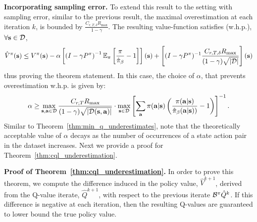 \textbf{Incorporating sampling error.} To extend this result to the setting with sampling error, similar to the previous result, the maximal overestimation at each iteration $k$, is bounded by $\frac{C_{r, T, \delta} R_{\max}}{1 - \gamma}$.
The resulting value-function satisfies (w.h.p.), $\forall \mathbf{s} \in \mathcal{D}$, 
\begin{equation*}
   \hat{V}^\pi(\mathbf{s}) \leq V^\pi(\mathbf{s}) - \alpha \left[\left(I - \gamma P^\pi \right)^{-1} \mathbb{E}_{\pi}\left[\frac{\pi}{\hat{\pi}_\beta} - 1 \right] \right](\mathbf{s}) + \left[ (I - \gamma P^\pi)^{-1} \frac{C_{r, T, \delta} R_{\max}}{(1- \gamma) \sqrt{|\mathcal{D}|}}\right](\mathbf{s})
\end{equation*}
thus proving the theorem statement. In this case, the choice of $\alpha$, that prevents overestimation w.h.p. is given by:
\begin{equation*}
    \alpha \geq \max_{\mathbf{s}, \mathbf{a} \in \mathcal{D}} \frac{C_{r, T} R_{\max}}{(1 - \gamma) \sqrt{|\mathcal{D}(\mathbf{s}, \mathbf{a})|}} \cdot \max_{\mathbf{s} \in \mathcal{D}} \left[\sum_{\mathbf{a}} \pi(\mathbf{a}|\mathbf{s}) \left(\frac{\pi(\mathbf{a}|\mathbf{s})}{\hat{\pi}_\beta(\mathbf{a}|\mathbf{s}))} - 1\right)\right]^{-1}.
\end{equation*}
Similar to Theorem~\ref{thm:min_q_underestimates}, note that the theoretically acceptable value of $\alpha$ decays as the number of occurrences of a state action pair in the dataset increases.
Next we provide a proof for Theorem~\ref{thm:cql_underestimation}.

\textbf{Proof of Theorem~\ref{thm:cql_underestimation}.} In order to prove this theorem, we compute the difference induced in the policy value, $\hat{V}^{k+1}$, derived from the Q-value iterate, $\hat{Q}^{k+1}$, with respect to the previous iterate $\mathcal{B}^\pi \hat{Q}^{k}$. If this difference is negative at each iteration, then the resulting Q-values are guaranteed to lower bound the true policy value.

